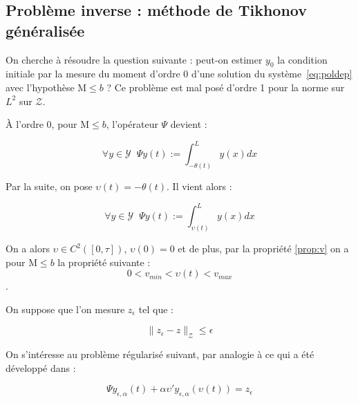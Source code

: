 \documentclass[a4paper]{article}
\newcommand{\mass}{\mathrm{M}}
\newcommand{\dep}{b}
\newcommand{\Y}{\mathscr{Y}}
\newcommand{\Z}{\mathscr{Z}}
\newcommand{\yea}{y_{\epsilon, \alpha}}
\begin{document}
\subsection{Problème inverse : méthode de Tikhonov généralisée}

On cherche à résoudre la question suivante : 
peut-on estimer $y_0$ la condition initiale par la mesure du moment d'ordre 0 d'une solution du système~\eqref{eq:poldep} avec l'hypothèse $\mass \leq \dep$ ?
Ce problème est mal posé d'ordre 1 pour la norme sur $L^2$ sur $\mathscr{Z}$.

À l'ordre 0, pour $\mass \leq \dep$, l'opérateur $\Psi$ devient :

\begin{equation}
	\forall y \in \Y \; \; \Psi y (t):= \int_{-\theta(t)}^L y(x)dx
\end{equation}

Par la suite, on pose $\upsilon(t) = - \theta (t) $.
Il vient alors :

\begin{equation}
	\label{def:psi0}
	\forall y \in \Y \; \; \Psi y (t):= \int_{\upsilon(t)}^L y(x)dx
\end{equation}

On a alors $\upsilon \in C^2([0,\tau])$, $\upsilon(0)=0$ et de plus,
par la propriété \ref{prop:v} on a pour $\mass \leq \dep$ la propriété suivante :
\[ 0< v_{min} < \upsilon(t) < v_{max} \].

On suppose que l'on mesure $z_{\epsilon}$ tel que :

\[ \| z_{\epsilon}-z \|_{\Z} \leq \epsilon \]

On s'intéresse au problème régularisé suivant, 
par analogie à ce qui a été développé dans \cite{Perthame} :

\[ \Psi \yea(t) + \alpha \upsilon'\yea(\upsilon(t)) = z_{\epsilon} \]
\end{document}
